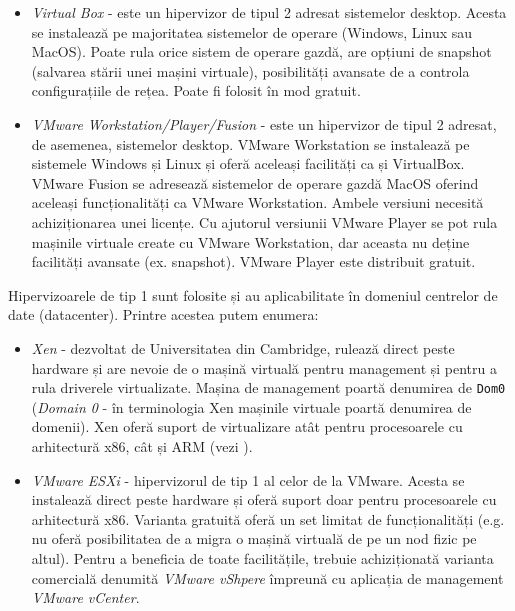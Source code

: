 \begin{itemize}
  \item \textit{Virtual Box} - este un hipervizor de tipul 2 adresat
    sistemelor desktop. Acesta se instalează pe majoritatea
    sistemelor de
    operare (Windows, Linux sau MacOS). Poate rula orice
    sistem de operare gazdă, are opțiuni de snapshot (salvarea
    stării unei mașini virtuale), posibilități avansate de a controla
    configurațiile de rețea. Poate fi folosit în mod gratuit.
  \item \textit{VMware Workstation/Player/Fusion} - este un hipervizor de
    tipul 2 adresat, de asemenea, sistemelor desktop. VMware
    Workstation se instalează pe sistemele Windows și Linux și oferă
    aceleași facilități ca și VirtualBox. VMware Fusion se adresează
    sistemelor de operare gazdă MacOS oferind aceleași
    funcționalități ca VMware Workstation. Ambele versiuni necesită
    achiziționarea unei licențe. Cu ajutorul versiunii VMware Player
    se pot rula mașinile virtuale create cu VMware
    Workstation, dar
    aceasta nu deține facilități avansate (ex. snapshot). VMware Player este
    distribuit gratuit.
\end{itemize}

Hipervizoarele de tip 1 sunt folosite și au aplicabilitate în domeniul centrelor
de date (datacenter). Printre acestea putem enumera:

\begin{itemize}
  \item \textit{Xen} - dezvoltat de Universitatea din Cambridge, rulează
    direct peste hardware și are nevoie de o mașină virtuală pentru
    management și pentru a rula driverele virtualizate. Mașina de
                management poartă denumirea de \texttt{Dom0} (\textit{Domain 0} - în terminologia
    Xen mașinile virtuale poartă denumirea de domenii). Xen oferă suport de virtualizare atât pentru procesoarele cu
    arhitectură x86, cât și ARM (vezi ).
  \item \textit{VMware ESXi} - hipervizorul de tip 1 al celor de la
    VMware. Acesta se instalează direct peste hardware și oferă
    suport doar pentru procesoarele cu arhitectură x86. Varianta
    gratuită oferă un set limitat de funcționalități (e.g. nu oferă
    posibilitatea de a migra o mașină virtuală de pe un nod fizic pe
    altul). Pentru a beneficia de toate facilitățile, trebuie
    achiziționată varianta comercială denumită \textit{VMware
    vShpere} împreună cu aplicația de management \textit{VMware
    vCenter}.
\end{itemize}

